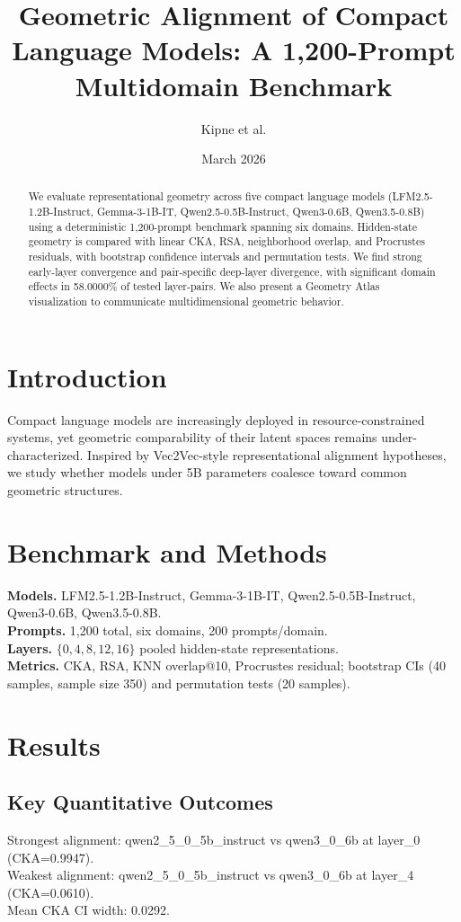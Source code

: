 ﻿\documentclass[11pt]{article}
\title{Geometric Alignment of Compact Language Models: A 1,200-Prompt Multidomain Benchmark}
\author{Kipne et al.}
\date{March 2026}
\begin{document}
\maketitle

\begin{abstract}
We evaluate representational geometry across five compact language models (LFM2.5-1.2B-Instruct, Gemma-3-1B-IT, Qwen2.5-0.5B-Instruct, Qwen3-0.6B, Qwen3.5-0.8B) using a deterministic 1,200-prompt benchmark spanning six domains. Hidden-state geometry is compared with linear CKA, RSA, neighborhood overlap, and Procrustes residuals, with bootstrap confidence intervals and permutation tests. We find strong early-layer convergence and pair-specific deep-layer divergence, with significant domain effects in 58.0000\% of tested layer-pairs. We also present a Geometry Atlas visualization to communicate multidimensional geometric behavior.
\end{abstract}

\section{Introduction}
Compact language models are increasingly deployed in resource-constrained systems, yet geometric comparability of their latent spaces remains under-characterized. Inspired by Vec2Vec-style representational alignment hypotheses, we study whether models under 5B parameters coalesce toward common geometric structures.

\section{Benchmark and Methods}
\textbf{Models.} LFM2.5-1.2B-Instruct, Gemma-3-1B-IT, Qwen2.5-0.5B-Instruct, Qwen3-0.6B, Qwen3.5-0.8B.\\
\textbf{Prompts.} 1,200 total, six domains, 200 prompts/domain.\\
\textbf{Layers.} $\{0,4,8,12,16\}$ pooled hidden-state representations.\\
\textbf{Metrics.} CKA, RSA, KNN overlap@10, Procrustes residual; bootstrap CIs (40 samples, sample size 350) and permutation tests (20 samples).

\section{Results}
\subsection{Key Quantitative Outcomes}
Strongest alignment: qwen2\_5\_0\_5b\_instruct vs qwen3\_0\_6b at layer\_0 (CKA=0.9947).\\
Weakest alignment: qwen2\_5\_0\_5b\_instruct vs qwen3\_0\_6b at layer\_4 (CKA=0.0610).\\
Mean CKA CI width: 0.0292.
\end{document}
